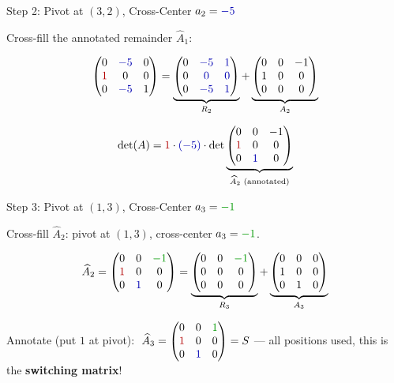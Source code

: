 \documentclass[10pt]{beamer}
\theoremstyle{definition}
\newcommand{\x}[1]{\alert{\textbf{#1}}}
\newcommand{\rd}[1]{{\color{red!70!black}#1}}
\newcommand{\bl}[1]{{\color{blue!70!black}#1}}
\newcommand{\gn}[1]{{\color{green!60!black}#1}}
\begin{document}
\begin{frame}{Step 2: Pivot at $(3,2)$, Cross-Center $a_2 = \bl{-5}$}

Cross-fill the annotated remainder $\widehat{A}_1$:

$$
\begin{pmatrix}
0 & \bl{-5} & 0 \\
\rd{1} & 0 & 0 \\
0 & \bl{-5} & 1
\end{pmatrix}
=
\underbrace{\begin{pmatrix}
0 & \bl{-5} & \bl{1} \\
0 & \bl{0} & \bl{0} \\
0 & \bl{-5} & \bl{1}
\end{pmatrix}}_{R_2}
+
\underbrace{\begin{pmatrix}
0 & 0 & -1 \\
1 & 0 & 0 \\
0 & 0 & 0
\end{pmatrix}}_{A_2}
$$

\vfill

$$
\det(A) = \rd{1}\cdot\bl{(-5)} \cdot \det
\underbrace{\begin{pmatrix} 0 & 0 & -1 \\ \rd{1} & 0 & 0 \\ 0 & \bl{1} & 0 \end{pmatrix}}_{\widehat{A}_2\text{ (annotated)}}
$$

\end{frame}


\begin{frame}{Step 3: Pivot at $(1,3)$, Cross-Center $a_3 = \gn{-1}$}

Cross-fill $\widehat{A}_2$: pivot at $(1,3)$, cross-center $a_3 = \gn{-1}$.

$$
\widehat{A}_2 = \begin{pmatrix}
0 & 0 & \gn{-1} \\
\rd{1} & 0 & 0 \\
0 & \bl{1} & 0
\end{pmatrix}
=
\underbrace{\begin{pmatrix}
0 & 0 & \gn{-1} \\
0 & 0 & 0 \\
0 & 0 & 0
\end{pmatrix}}_{R_3}
+
\underbrace{\begin{pmatrix}
0 & 0 & 0 \\
1 & 0 & 0 \\
0 & 1 & 0
\end{pmatrix}}_{A_3}
$$

\vfill

Annotate (put $1$ at pivot):
$\;\widehat{A}_3 = \begin{pmatrix} 0 & 0 & \gn{1} \\ \rd{1} & 0 & 0 \\ 0 & \bl{1} & 0 \end{pmatrix} = S$
\quad --- all positions used, this is the \x{switching matrix}!

\end{frame}
\end{document}
